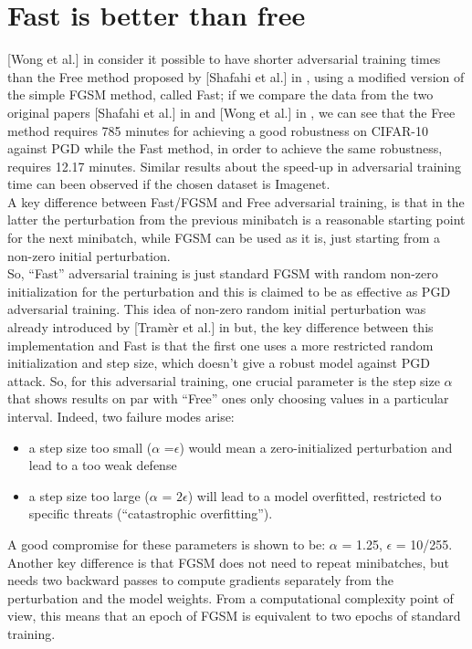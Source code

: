 \documentclass{article}
\begin{document}
\section{Fast is better than free}

[Wong et al.] in \cite{WongEtAl2020} consider it possible to have shorter
adversarial training times than the Free method proposed by [Shafahi et al.] in
\cite{ShafahiEtAl2019b}, using a modified version of the simple FGSM method,
called Fast; if we compare the data from the two original papers [Shafahi et
al.] in \cite{ShafahiEtAl2019b} and [Wong et al.] in \cite{WongEtAl2020}, we can see
that the Free method requires 785 minutes for achieving a good robustness on
CIFAR-10 against PGD while the Fast method, in order to achieve the same
robustness, requires 12.17 minutes. Similar results about the speed-up in
adversarial training time can been observed if the chosen dataset is Imagenet.\\
A key difference between Fast/FGSM and Free adversarial training, is that in the
latter the perturbation from the previous minibatch is a reasonable starting
point for the next minibatch, while FGSM can be used as it is, just starting
from a non-zero initial perturbation.\\
So, “Fast” adversarial training is just standard FGSM with random non-zero
initialization for the perturbation and this is claimed to be as effective as
PGD adversarial training. This idea of non-zero random initial perturbation was
already introduced by [Tramèr et al.] in \cite{TramerEtAl2017} but, the key
difference between this implementation and Fast is that the first one uses a
more restricted random initialization and step size, which doesn't give a robust
model against PGD attack.  So, for this adversarial training, one crucial
parameter is the step size $\alpha$ that shows results on par with “Free” ones
only choosing values in a particular interval. Indeed, two failure modes arise:
\begin{itemize}

\item a step size too small ($\alpha$ =$\epsilon$) would mean a zero-initialized
perturbation and lead to a too weak defense
\item a step size too large ($\alpha$ = $2\epsilon$) will lead to a model
overfitted, restricted to specific threats (“catastrophic overfitting”).
\end{itemize}

A good compromise for these parameters is shown to be: $\alpha$ = 1.25,
$\epsilon$ = 10/255.\\
Another key difference is that FGSM does not need to repeat minibatches, but
needs two backward passes to compute gradients separately from the perturbation
and the model weights. From a computational complexity point of view, this means
that an epoch of FGSM is equivalent to two epochs of standard training.
\end{document}
